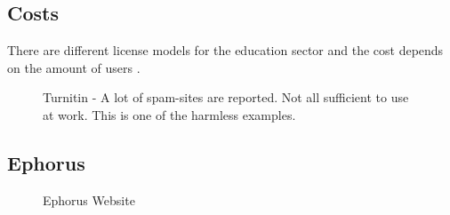 \subsection*{Costs}
There are different license models for the education sector and the cost depends on the amount of users . 

 \begin{figure}[!h]
  \centering
  \caption{Turnitin - A lot of spam-sites are reported. Not all sufficient to use at work. This is one of the harmless examples.}
  \label{fig:TurnitinSpamExample}
\end{figure}






\newpage

\subsection{Ephorus}

 \begin{figure}[!h]
  \centering
  \caption{Ephorus Website}
  \label{fig:plagawareWebsite}
\end{figure}

